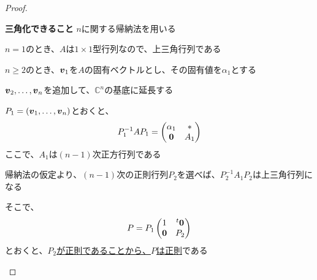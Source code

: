\documentclass[../../../topic_linear-algebra]{subfiles}
\begin{document}
\begin{proof}
  \begin{subpattern}{\bfseries 三角化できること}
    $n$に関する帰納法を用いる

    \br

    $n=1$のとき、$A$は$1\times 1$型行列なので、上三角行列である

    \br

    $n \geq 2$のとき、$\vb*{v}_1$を$A$の固有ベクトルとし、その固有値を$\alpha_1$とする

    $\vb*{v}_2,\ldots,\vb*{v}_n$を追加して、$\mathbb{C}^n$の基底に延長する

    $P_1 = (\vb*{v}_1,\ldots,\vb*{v}_n)$とおくと、
    \begin{equation*}
      P_1^{-1}AP_1 = \begin{pmatrix}
        \alpha_1 & *   \\
        \vb*{0}  & A_1
      \end{pmatrix}
    \end{equation*}
    ここで、$A_1$は$(n-1)$次正方行列である

    \br

    帰納法の仮定より、$(n-1)$次の正則行列$P_2$を選べば、$P_2^{-1}A_1P_2$は上三角行列になる

    \br

    そこで、
    \begin{equation*}
      P = P_1 \begin{pmatrix}
        1       & {}^t\vb*{0} \\
        \vb*{0} & P_2
      \end{pmatrix}
    \end{equation*}
    とおくと、\hyperref[thm:block-diagonal-invertibility]{$P_2$が正則であることから、$P$は正則}である


\end{subpattern}
\end{proof}
\end{document}
